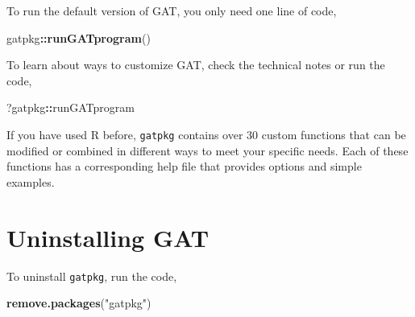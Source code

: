 \documentclass[
]{article}
\newenvironment{Shaded}{\begin{snugshade}}{\end{snugshade}}
\newcommand{\KeywordTok}[1]{\textcolor[rgb]{0.13,0.29,0.53}{\textbf{#1}}}
\newcommand{\NormalTok}[1]{#1}
\newcommand{\OperatorTok}[1]{\textcolor[rgb]{0.81,0.36,0.00}{\textbf{#1}}}
\newcommand{\StringTok}[1]{\textcolor[rgb]{0.31,0.60,0.02}{#1}}
\begin{document}
To run the default version of GAT, you only need one line of code,

\begin{Shaded}
\begin{Highlighting}[]
\NormalTok{gatpkg}\OperatorTok{::}\KeywordTok{runGATprogram}\NormalTok{()}
\end{Highlighting}
\end{Shaded}

To learn about ways to customize GAT, check the technical notes or run
the code,

\begin{Shaded}
\begin{Highlighting}[]
\NormalTok{?gatpkg}\OperatorTok{::}\NormalTok{runGATprogram}
\end{Highlighting}
\end{Shaded}

If you have used R before, \texttt{gatpkg} contains over 30 custom
functions that can be modified or combined in different ways to meet
your specific needs. Each of these functions has a corresponding help
file that provides options and simple examples.

\hypertarget{uninstalling-gat}{%
\section{Uninstalling GAT}\label{uninstalling-gat}}

To uninstall \texttt{gatpkg}, run the code,

\begin{Shaded}
\begin{Highlighting}[]
\KeywordTok{remove.packages}\NormalTok{(}\StringTok{"gatpkg"}\NormalTok{)}
\end{Highlighting}
\end{Shaded}
\end{document}
